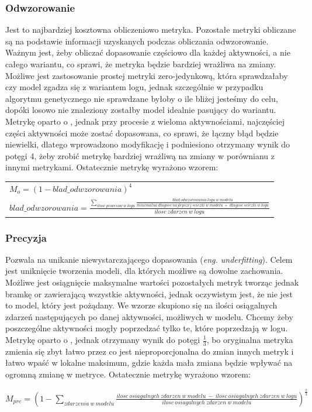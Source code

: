 \subsubsection{Odwzorowanie} 
Jest to najbardziej kosztowna obliczeniowo metryka. Pozostałe metryki obliczane są na podstawie informacji uzyskanych podczas obliczania odwzorowanie. Ważnym jest, żeby obliczać dopasowanie częściowo dla każdej aktywności, a nie całego wariantu, co sprawi, że metryka będzie bardziej wrażliwa na zmiany. Możliwe jest zastosowanie prostej metryki zero-jedynkową, która sprawdzałaby czy model zgadza się z wariantem logu, jednak szczególnie w przypadku algorytmu genetycznego nie sprawdzane byłoby o ile bliżej jesteśmy do celu, dopóki losowo nie znaleziony zostałby model idealnie pasujący do wariantu. Metrykę oparto o \cite{metric-calculation}, jednak przy procesie z wieloma aktywnościami, najczęściej części aktywności może zostać dopasowana, co sprawi, że łączny błąd będzie niewielki, dlatego wprowadzono modyfikację i podniesiono otrzymany wynik do potęgi 4, żeby zrobić metrykę bardziej wrażliwą na zmiany w porównianu z innymi metrykami. Ostatecznie metrykę wyrażono wzorem:
\begin{center}
\begin{tabular}{l}
$M_o = (1 - blad\_odwzorowania)^4$ \\
$blad\_odwzorowania = \frac{\sum_{ilosc\ procesow\ w\ logu} \frac{blad\ odwzorowania\ logu\ w\ modelu}{minimalna\ długosc\ najlepszej\ sciezki\ w\ modelu\ +\ długosc\ sciezki\ w\ logu}}{ilosc\ zdarzen \ w\ logu}$
\end{tabular}
\end{center}
\subsubsection{Precyzja} 
Pozwala na unikanie niewystarczającego dopasowania (\textit{eng. underfitting}). Celem jest uniknięcie tworzenia modeli, dla których możliwe są dowolne zachowania. Możliwe jest osiągnięcie maksymalne wartości pozostałych metryk tworząc jednak bramkę or zawierającą wszystkie aktywności, jednak oczywistym jest, że nie jest to model, który jest pożądany. We wzorze skupiono się na ilości osiągalnych zdarzeń następujących po danej aktywności, możliwych w modelu. Chcemy żeby poszczególne aktywności mogły poprzedzać tylko te, które poprzedzają w logu. Metrykę oparto o \cite{precision-calculation}, jednak otrzymany wynik do potęgi $\frac{1}{3}$, bo oryginalna metryka zmienia się zbyt łatwo przez co jest nieproporcjonalna do zmian innych metryk i łatwo wpaść w lokalne maksimum, gdzie każda mała zmiana będzie wpływać na ogromną zmianę w metryce.  Ostatecznie metrykę wyrażono wzorem:
\begin{center}
$M_{pre} = (1 - \sum_{zdarzenia\ w\ modelu} \frac{ilosc\ osiagalnych\ zdarzen\ w\ modelu\ -\ ilosc\ osiagalnych\ zdarzen\ w\ logu}{ilosc\ osiagalnych\ zdarzen\ w\ modelu})^{\frac{1}{3}} $
\end{center}
